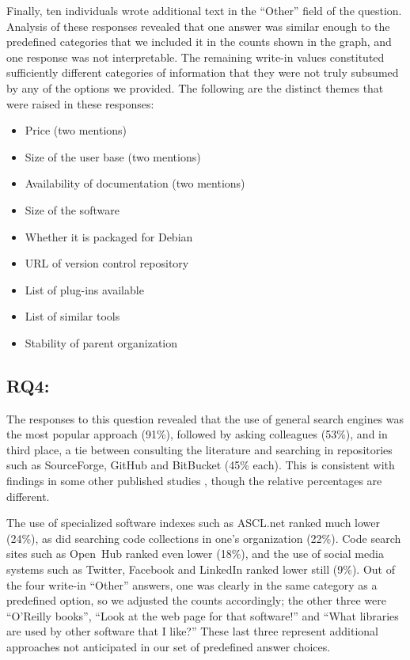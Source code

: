 \documentclass[review]{elsarticle}
\begin{document}
Finally, ten individuals wrote additional text in the ``Other'' field of the question.  Analysis of these responses revealed that one answer was similar enough to the predefined categories that we included it in the counts shown in the graph, and one response was not interpretable.  The remaining write-in values constituted sufficiently different categories of information that they were not truly subsumed by any of the options we provided.  The following are the distinct themes that were raised in these responses:

\begin{itemize}[itemsep=-0.5ex]

\item Price (two mentions)
\item Size of the user base (two mentions)
\item Availability of documentation (two mentions)
\item Size of the software
\item Whether it is packaged for Debian
\item URL of version control repository
\item List of plug-ins available
\item List of similar tools
\item Stability of parent organization

\end{itemize}


\subsection{RQ4: \rqfourtext}
\label{discussion-rqfour}

The responses to this question revealed that the use of general search engines was the most popular approach (91\%), followed by asking colleagues (53\%), and in third place, a tie between consulting the literature and searching in repositories such as SourceForge, GitHub and BitBucket (45\% each).  This is consistent with findings in some other published studies \citep[e.g.,][]{lawrence2015science}, though the relative percentages are different.

The use of specialized software indexes such as ASCL.net ranked much lower (24\%), as did searching code collections in one's organization (22\%).  Code search sites such as Open~Hub ranked even lower (18\%), and the use of social media systems such as Twitter, Facebook and LinkedIn ranked lower still (9\%).  Out of the four write-in ``Other'' answers, one was clearly in the same category as a predefined option, so we adjusted the counts accordingly; the other three were ``O'Reilly books'', ``Look at the web page for that software!'' and ``What libraries are used by other software that I like?''  These last three represent additional approaches not anticipated in our set of predefined answer choices.
\end{document}
